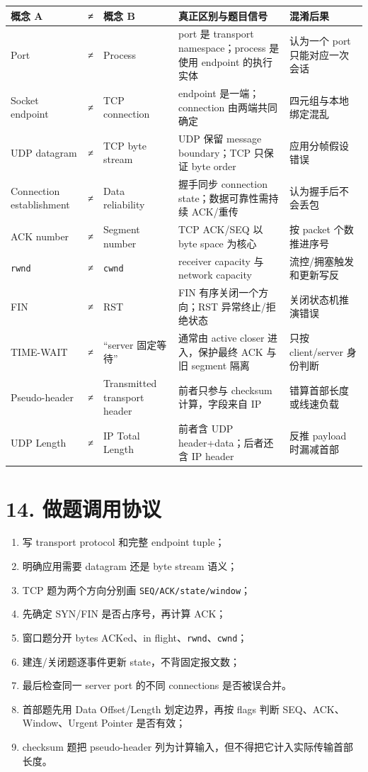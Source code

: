 \documentclass[UTF8,fontset=none,11pt,a4paper]{ctexart}
\providecommand{\tightlist}{\setlength{\itemsep}{0pt}\setlength{\parskip}{0pt}}
\providecommand{\passthrough}[1]{#1}
\begin{document}
\begin{longtable}[]{@{}lclll@{}}
\toprule\noalign{}
概念 A & ≠ & 概念 B & 真正区别与题目信号 & 混淆后果 \\
\midrule\noalign{}
\endhead
\bottomrule\noalign{}
\endlastfoot
Port & ≠ & Process & port 是 transport namespace；process 是使用
endpoint 的执行实体 & 认为一个 port 只能对应一次会话 \\
Socket endpoint & ≠ & TCP connection & endpoint 是一端；connection
由两端共同确定 & 四元组与本地绑定混乱 \\
UDP datagram & ≠ & TCP byte stream & UDP 保留 message boundary；TCP
只保证 byte order & 应用分帧假设错误 \\
Connection establishment & ≠ & Data reliability & 握手同步 connection
state；数据可靠性需持续 ACK/重传 & 认为握手后不会丢包 \\
ACK number & ≠ & Segment number & TCP ACK/SEQ 以 byte space 为核心 & 按
packet 个数推进序号 \\
\passthrough{\lstinline!rwnd!} & ≠ & \passthrough{\lstinline!cwnd!} &
receiver capacity 与 network capacity & 流控/拥塞触发和更新写反 \\
FIN & ≠ & RST & FIN 有序关闭一个方向；RST 异常终止/拒绝状态 &
关闭状态机推演错误 \\
TIME-WAIT & ≠ & ``server 固定等待'' & 通常由 active closer
进入，保护最终 ACK 与旧 segment 隔离 & 只按 client/server 身份判断 \\
Pseudo-header & ≠ & Transmitted transport header & 前者只参与 checksum 计算，字段来自 IP & 错算首部长度或线速负载 \\
UDP Length & ≠ & IP Total Length & 前者含 UDP header+data；后者还含 IP header & 反推 payload 时漏减首部 \\
\end{longtable}

\section{14.
做题调用协议}\label{12-ux505aux9898ux8c03ux7528ux534fux8bae}

\begin{enumerate}
\def\labelenumi{\arabic{enumi}.}
\tightlist
\item
  写 transport protocol 和完整 endpoint tuple；
\item
  明确应用需要 datagram 还是 byte stream 语义；
\item
  TCP 题为两个方向分别画
  \passthrough{\lstinline!SEQ/ACK/state/window!}；
\item
  先确定 SYN/FIN 是否占序号，再计算 ACK；
\item
  窗口题分开 bytes ACKed、in
  flight、\passthrough{\lstinline!rwnd!}、\passthrough{\lstinline!cwnd!}；
\item
  建连/关闭题逐事件更新 state，不背固定报文数；
\item
  最后检查同一 server port 的不同 connections 是否被误合并。
\item
  首部题先用 Data Offset/Length 划定边界，再按 flags 判断 SEQ、ACK、Window、Urgent Pointer 是否有效；
\item
  checksum 题把 pseudo-header 列为计算输入，但不得把它计入实际传输首部长度。
\end{enumerate}
\end{document}
